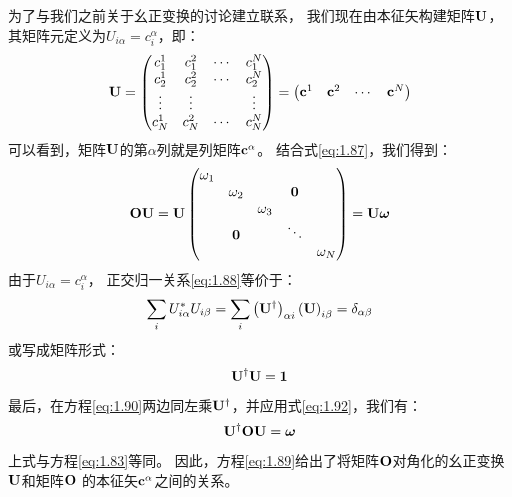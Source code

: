 为了与我们之前关于幺正变换的讨论建立联系，
我们现在由本征矢构建矩阵$\mathbf U$，
其矩阵元定义为$U_{i\alpha} = c_i^\alpha$，即：
\begin{equation}
 \mathbf{U} = \begin{pmatrix}
     c_1^1     &c_1^2     &\cdots &c_1^N \\
     c_2^1     &c_2^2     &\cdots &c_2^N \\
     \vdots &\vdots &                &\vdots\\
     c_N^1     &c_N^2     &\cdots &c_N^N
 \end{pmatrix} = \begin{pmatrix}
     \mathbf{c}^1 &\mathbf{c}^2 &\cdots &\mathbf{c}^N
 \end{pmatrix}
 \label{eq:1.89}
\end{equation}
可以看到，矩阵$\mathbf U$的第$\alpha$列就是列矩阵$\mathbf{c^\alpha}$。
结合式\eqref{eq:1.87}，我们得到：
\begin{equation}
 \mathbf{OU} = \mathbf{U} \begin{pmatrix}
     \omega_1     & & & &\\
          &\omega_2 &     &\mathbf{0} &\\
          & &\omega_3 & &\\
          &\mathbf{0} & & \ddots & \\
          & &     & &\omega_N
 \end{pmatrix} = \mathbf{U}\boldsymbol\omega
 \label{eq:1.90}
\end{equation}
由于$U_{i\alpha} = c_i^\alpha$，
正交归一关系\eqref{eq:1.88}等价于：
\begin{equation}
 \sum_i U_{i\alpha}^\ast U_{i\beta} = \sum_i \left(\mathbf U^\dagger\right)_{\alpha i}\left(\mathbf{U}\right)_{i\beta} = \delta_{\alpha\beta}
 \label{eq:1.91}
\end{equation}
或写成矩阵形式：
\begin{equation}
 \mathbf U^\dagger\mathbf{U} = \mathbf{1}
 \label{eq:1.92}
\end{equation}
最后，在方程\eqref{eq:1.90}两边同左乘$\mathbf U^\dagger$，并应用式\eqref{eq:1.92}，我们有：
\begin{equation}
 \mathbf U^\dagger\mathbf{OU} = \boldsymbol\omega
 \label{eq:1.93}
\end{equation}
上式与方程\eqref{eq:1.83}等同。
因此，方程\eqref{eq:1.89}给出了将矩阵$\mathbf O$对角化的幺正变换$\mathbf U$和矩阵$\mathbf O$ 的本征矢$\mathbf{c}^\alpha$之间的关系。


